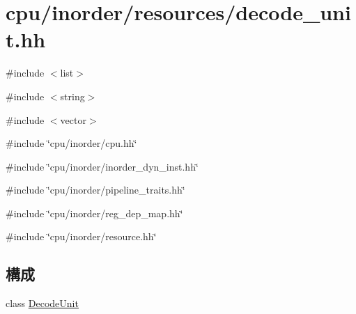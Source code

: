 \hypertarget{decode__unit_8hh}{
\section{cpu/inorder/resources/decode\_\-unit.hh}
\label{decode__unit_8hh}
}
{\ttfamily \#include $<$list$>$}\par
{\ttfamily \#include $<$string$>$}\par
{\ttfamily \#include $<$vector$>$}\par
{\ttfamily \#include \char`\"{}cpu/inorder/cpu.hh\char`\"{}}\par
{\ttfamily \#include \char`\"{}cpu/inorder/inorder\_\-dyn\_\-inst.hh\char`\"{}}\par
{\ttfamily \#include \char`\"{}cpu/inorder/pipeline\_\-traits.hh\char`\"{}}\par
{\ttfamily \#include \char`\"{}cpu/inorder/reg\_\-dep\_\-map.hh\char`\"{}}\par
{\ttfamily \#include \char`\"{}cpu/inorder/resource.hh\char`\"{}}\par
\subsection*{構成}
\begin{DoxyCompactItemize}
\item 
class \hyperlink{classDecodeUnit}{DecodeUnit}
\end{DoxyCompactItemize}
